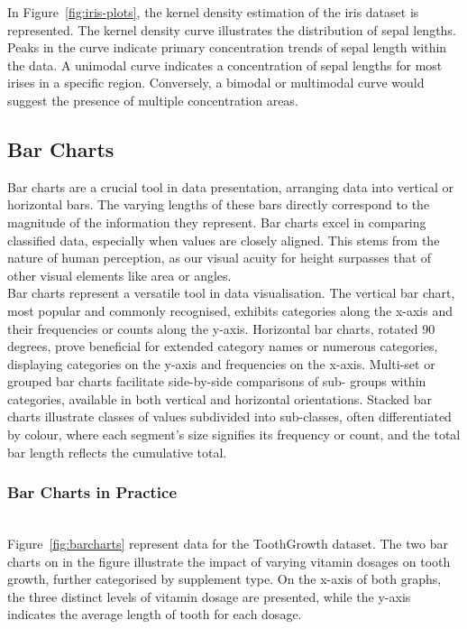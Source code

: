 \documentclass{article}\usepackage[]{graphicx}\usepackage[]{xcolor}
\numberwithin{equation}{section}
\begin{document}
\noindent In Figure~\ref{fig:iris-plots}, the kernel density estimation of the iris dataset is represented. The kernel density curve illustrates the distribution of sepal lengths. Peaks in the curve indicate primary concentration trends of sepal length within the data. A unimodal curve indicates a concentration of sepal lengths for most irises in a specific region. Conversely, a bimodal or multimodal curve would suggest the presence of multiple concentration areas.


\subsection{Bar Charts}
\noindent Bar charts are a crucial tool in data presentation, arranging data into vertical or horizontal bars. The varying lengths of these bars directly correspond to the magnitude of the information they represent. Bar charts excel in comparing classified data, especially when values are closely aligned. This stems from the nature of human perception, as our visual acuity for height surpasses that of other visual elements like area or angles.\\

\noindent Bar charts represent a versatile tool in data visualisation. The vertical bar chart, most popular and commonly recognised, exhibits categories along the x-axis and their frequencies or counts along the y-axis. Horizontal bar charts, rotated 90 degrees, prove beneficial for extended category names or numerous categories, displaying categories on the y-axis and frequencies on the x-axis. Multi-set or grouped bar charts facilitate side-by-side comparisons of sub- groups within categories, available in both vertical and horizontal orientations. Stacked bar charts illustrate classes of values subdivided into sub-classes, often differentiated by colour, where each segment's size signifies its frequency or count, and the total bar length reflects the cumulative total.

\subsubsection{Bar Charts in Practice}\\
\noident Figure~\ref{fig:barcharts} represent data for the ToothGrowth dataset. The two bar charts on in the figure illustrate the impact of varying vitamin dosages on tooth growth, further categorised by supplement type. On the x-axis of both graphs, the three distinct levels of vitamin dosage are presented, while the y-axis indicates the average length of tooth for each dosage.\\
\end{document}
